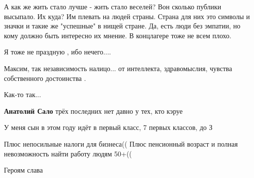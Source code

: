 \begin{itemize}
А как же жить стало лучше - жить стало веселей? Вон сколько публики высыпало.
Их куда? Им плевать на людей страны. Страна для них это символы и значки и
такие же "успешные" в нищей стране. Да, есть люди без эмпатии, но кому должно
быть интересно их мнение. В концлагере тоже не всем плохо.

 
Я тоже не праздную , ибо нечего....


Максим, так независимость налицо... от интеллекта, здравомыслия, чувства собственного достоинства .

Как-то так...

\begin{itemize}
 
\textbf{Анатолий Сало} трёх последних нет давно у тех, кто кэруе
\end{itemize}

 
У меня сын в этом году идёт в первый класс, 7 первых классов, до З

 
Плюс непосильные налоги для бизнеса((
Плюс пенсионный возраст и полная невозможность найти работу людям 50+((

 
Героям слава

 

\end{itemize}
